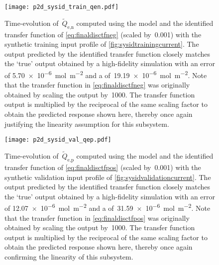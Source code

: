 \begin{figure}[!htbp]
    \centering
    \texttt{[image: p2d\_sysid\_train\_qen.pdf]}
    \caption[$\widetilde{Q}_{\text{e,n}}(t)$ outputs from  and
    identified transfer function for training profile]{%
        Time-evolution of~$\widetilde{Q}_{\text{e,n}}$ computed using the
         model  and the identified transfer function
        of \cref{eq:finaldisctfneg} (scaled by~0.001) with the synthetic
        training input profile of \cref{fig:sysidtrainingcurrent}. The output
        predicted by the identified transfer function closely matches the `true'
        output obtained by a high-fidelity  simulation with an
         error of \SI{5.70e-6}{\mole\per\meter\squared} and a
         of~\SI{19.19e-6}{\mole\per\meter\squared}. Note that the
        transfer function in \cref{eq:finaldisctfneg} was originally obtained by
        scaling the output by~1000. The transfer function output is
        multiplied by the reciprocal of the same scaling factor to obtain the
        predicted response shown here, thereby once again justifying the
        linearity assumption for this subsystem.
    }%
    \label{fig:tfpredQentrain}
\end{figure}
\begin{figure}[!htbp]
    \centering
    \texttt{[image: p2d\_sysid\_val\_qep.pdf]}
    \caption[$\widetilde{Q}_{\text{e,p}}(t)$ outputs from  and
    identified transfer function for training profile]{%
        Time-evolution of~$\widetilde{Q}_{\text{e,p}}$ computed using the
         model  and the identified transfer function
        of \cref{eq:finaldisctfpos} (scaled by~0.001) with the synthetic
        validation input profile of \cref{fig:sysidvalidationcurrent}. The output
        predicted by the identified transfer function closely matches the `true'
        output obtained by a high-fidelity  simulation with an
         error of \SI{12.07e-6}{\mole\per\meter\squared} and a
         of~\SI{31.59e-6}{\mole\per\meter\squared}. Note that the
        transfer function in \cref{eq:finaldisctfpos} was originally obtained by
        scaling the output by~1000. The transfer function output is
        multiplied by the reciprocal of the same scaling factor to obtain the
        predicted response shown here, thereby once again confirming the
        linearity of this subsystem.
    }%
    \label{fig:tfpredQepval}
\end{figure}

